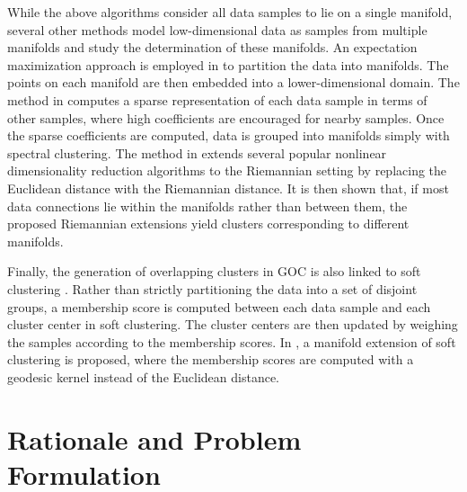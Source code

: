 \documentclass[journal]{IEEEtran}
\begin{document}
While the above algorithms consider all data samples to lie on a single manifold, several other methods model low-dimensional data as samples from multiple manifolds and study the determination of these manifolds. An expectation maximization approach is employed in \cite{Souvenir2005} to partition the data into manifolds. The points on each manifold are then embedded into a lower-dimensional domain. The method in \cite{Elhamifar2011} computes a sparse representation of each data sample in terms of other samples, where high coefficients are encouraged for nearby samples. Once the sparse coefficients are computed, data is grouped into manifolds simply with spectral clustering. The method in \cite{Goh2008} extends several popular nonlinear dimensionality reduction algorithms to the Riemannian setting by replacing the Euclidean distance with the Riemannian distance. It is then shown that, if most data connections lie within the manifolds rather than between them, the proposed Riemannian extensions yield clusters corresponding to different manifolds. 

Finally, the generation of overlapping clusters in GOC is also linked to soft clustering \cite{Bezdek1984}. Rather than strictly partitioning the data into a set of disjoint groups, a membership score is computed between each data sample and each cluster center in soft clustering. The cluster centers are then updated by weighing the samples according to the membership scores. In \cite{Kim07soft}, a manifold extension of soft clustering is proposed, where the membership scores are computed with a geodesic kernel instead of the Euclidean distance. 








 
%
%
%
%
\section{Rationale and Problem Formulation}
\label{sec:problem}
\end{document}
